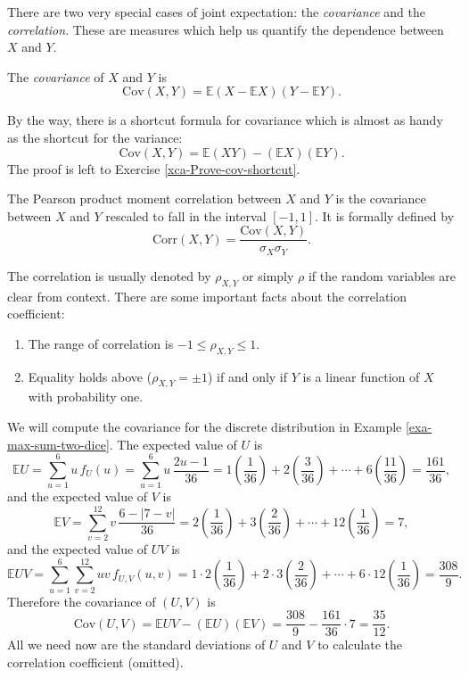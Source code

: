 There are two very special cases of joint expectation: the
\emph{covariance} and the \emph{correlation}. These are measures which help us
quantify the dependence between \(X\) and \(Y\).

\begin{defn}
The \emph{covariance} of \(X\) and \(Y\) is
\begin{equation}
\mbox{Cov}(X,Y)=\mathbb{E}(X-\mathbb{E} X)(Y-\mathbb{E} Y).
\end{equation}
\end{defn}

By the way, there is a shortcut formula for covariance which is almost
as handy as the shortcut for the variance:
\begin{equation}
\mbox{Cov}(X,Y)=\mathbb{E}(XY)-(\mathbb{E} X)(\mathbb{E} Y).
\end{equation}
The proof is left to Exercise \ref{xca-Prove-cov-shortcut}.

The Pearson product moment correlation between \(X\) and \(Y\) is the
covariance between \(X\) and \(Y\) rescaled to fall in the interval
\([-1,1]\). It is formally defined by
\begin{equation}
\mbox{Corr}(X,Y)=\frac{\mbox{Cov}(X,Y)}{\sigma_{X}\sigma_{Y}}.
\end{equation}

The correlation is usually denoted by \(\rho_{X,Y}\) or simply
\(\rho\) if the random variables are clear from context. There are
some important facts about the correlation coefficient:
\begin{enumerate}
\item The range of correlation is \(-1\leq\rho_{X,Y}\leq1\).
\item Equality holds above (\(\rho_{X,Y}=\pm1\)) if and only if \(Y\) is a linear function of \(X\) with probability one.
\end{enumerate}

\label{exa-max-sum-dice-covariance} We will compute the covariance for the
discrete distribution in Example \ref{exa-max-sum-two-dice}. The expected
value of \(U\) is \[ \mathbb{E} U=\sum_{u=1}^{6}u\,
f_{U}(u)=\sum_{u=1}^{6}u\,\frac{2u-1}{36}=1\left(\frac{1}{36}\right)+2\left(\frac{3}{36}\right)+\cdots+6\left(\frac{11}{36}\right)=\frac{161}{36},
\] and the expected value of \(V\) is \[ \mathbb{E}
V=\sum_{v=2}^{12}v\,\frac{6-|7-v|}{36}=2\left(\frac{1}{36}\right)+3\left(\frac{2}{36}\right)+\cdots+12\left(\frac{1}{36}\right)=7,
\] and the expected value of \(UV\) is \[ \mathbb{E}
UV=\sum_{u=1}^{6}\sum_{v=2}^{12}uv\,
f_{U,V}(u,v)=1\cdot2\left(\frac{1}{36}\right)+2\cdot3\left(\frac{2}{36}\right)+\cdots+6\cdot12\left(\frac{1}{36}\right)=\frac{308}{9}.
\] Therefore the covariance of \((U,V)\) is \[
\mbox{Cov}(U,V)=\mathbb{E} UV-\left(\mathbb{E}
U\right)\left(\mathbb{E}
V\right)=\frac{308}{9}-\frac{161}{36}\cdot7=\frac{35}{12}.  \] All we
need now are the standard deviations of \(U\) and \(V\) to calculate
the correlation coefficient (omitted).


